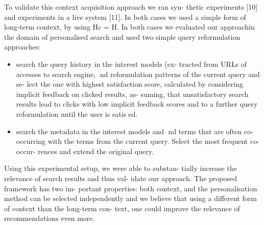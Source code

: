 \documentclass{acm_proc_article-sp} %
\begin{document}
 To validate this context acquisition approach we ran syn-
thetic experiments [10] and experiments in a live system [11].
In both cases we used a simple form of long-term context,
by using Hc = H. In both cases we evaluated our approachin the domain of personalised search and used two simple
 query reformulation approaches:
  \begin{itemize}
  	\item search the query history in the interest models (ex-
  	tracted from URLs of accesses to search engine, nd
  	reformulation patterns of the current query and se-
  	lect the one with highest satisfaction score, calculated
  	by considering implicit feedback on clicked results, as-
  	suming, that unsatisfactory search results lead to clicks
  	with low implicit feedback scores and to a further query
  	reformulation until the user is satised.
  \item 
  search the metadata in the interest models and nd
  terms that are often co-occurring with the terms from
  the current query. Select the most frequent co-occur-
  rences and extend the original query.  	
 \end{itemize}
 Using this experimental setup, we were able to substan-
 tially increase the relevance of search results and thus val-
 idate our approach. The proposed framework has two im-
 portant properties: both context, and the personalisation
 method can be selected independently and we believe that
 using a different form of context than the long-term con-
 text, one could improve the relevance of recommendations
 even more.
\end{document}
